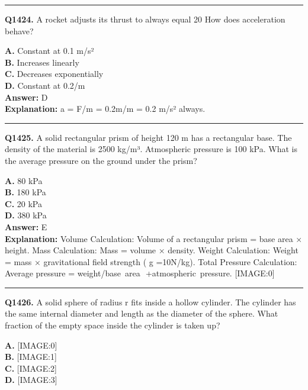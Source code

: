 \documentclass[12pt]{article}
\begin{document}
\hrule
\vspace{1em}


\noindent
\textbf{Q1424.} A rocket adjusts its thrust to always equal 20%
How does acceleration behave?



\textbf{A.} Constant at 0.1 m/s² \\
\textbf{B.} Increases linearly \\
\textbf{C.} Decreases exponentially \\
\textbf{D.} Constant at 0.2/m \\

\textbf{Answer:} D \\
\textbf{Explanation:} a = F/m = 0.2m/m = 0.2 m/s² always.

\hrule
\vspace{1em}


\noindent
\textbf{Q1425.} A solid rectangular prism of height 120 m has a rectangular base. The density of the material is 2500 kg/m³. Atmospheric pressure is 100 kPa. What is the average pressure on the ground under the prism?



\textbf{A.} 80 kPa \\
\textbf{B.} 180 kPa \\
\textbf{C.} 20 kPa \\
\textbf{D.} 380 kPa \\

\textbf{Answer:} E \\
\textbf{Explanation:} Volume Calculation: Volume of a rectangular prism = base area × height.
Mass Calculation: Mass = volume × density.
Weight Calculation: Weight = mass × gravitational field strength (
g
=10N/kg).
Total Pressure Calculation: Average pressure = weight/base area
​
+atmospheric pressure.
[IMAGE:0]

\hrule
\vspace{1em}


\noindent
\textbf{Q1426.} A solid sphere of radius r fits inside a hollow cylinder. The cylinder has the same internal diameter and length as the diameter of the sphere. What fraction of the empty space inside the cylinder is taken up?



\textbf{A.} [IMAGE:0] \\
\textbf{B.} [IMAGE:1] \\
\textbf{C.} [IMAGE:2] \\
\textbf{D.} [IMAGE:3] \\
\end{document}

